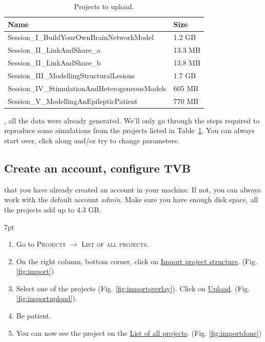 \documentclass{tufte-handout}
\newenvironment{formal}{%
  \def\FrameCommand{%
    \hspace{1pt}%
    {\color{DarkBlue}\vrule width 2pt}%
    {\color{formalshade}\vrule width 4pt}%
    \colorbox{formalshade}%
  }%
  \MakeFramed{\advance\hsize-\width\FrameRestore}%
  \noindent\hspace{-4.55pt}%
  \begin{adjustwidth}{}{7pt}%
  \vspace{2pt}\vspace{2pt}%
}
{%
  \vspace{2pt}\end{adjustwidth}\endMakeFramed%
}
\begin{document}
\begin{table}
  \centering
  \selectfont
  \begin{tabular}{ll}
    \toprule
    Name & Size \\
    \midrule
    Session\_I\_BuildYourOwnBrainNetworkModel  & 1.2 GB\\
    Session\_II\_LinkAndShare\_a & 13.3 MB  \\
    Session\_II\_LinkAndShare\_b & 13.8 MB  \\
    Session\_III\_ModellingStructuralLesions & 1.7 GB  \\
    Session\_IV\_StimulationAndHeterogeneousModels & 605 MB \\
    Session\_V\_ModellingAnEpilepticPatient & 770 MB \\ 
    \bottomrule
  \end{tabular}
  \caption{Projects to upload.}
  \label{tab:normaltab}
\end{table}

, all the data were already generated. We'll only go through the steps required 
to reproduce some simulations from the projects listed in Table~\ref{tab:normaltab}. You can always start over, click along and/or try to change parameters.


\subsection{Create an account, configure TVB}

 that you have already created an account in your machine. 
If not, you can always work with the default account \textit{admin}. 
Make sure you have enough disk space, all the projects add up to 4.3 GB. 


\begin{formal}
\begin{enumerate}
\item Go to \textsc{Projects} $\rightarrow$ \textsc{List of all projects}.
\item On the right column, bottom corner, click on \underline{Import project structure}. (Fig. \ref{fig:import})
\item Select one of the projects (Fig. \ref{fig:importoverlay}).  Click on \underline{Upload}. (Fig. \ref{fig:importupload}).
\item Be patient. 
\item You can now see the project on the \underline{List of all projects}. (Fig. \ref{fig:importdone})
\end{enumerate}
\end{formal}
\end{document}
